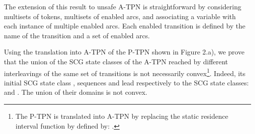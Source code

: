 \documentclass[submission,copyright,creativecommons]{eptcs}
\numberwithin{equation}{section}
\begin{document}
\par The extension of this result to unsafe A-TPN is straightforward by considering multisets of tokens, multisets of enabled arcs, and associating a variable with each instance of multiple enabled arcs. Each enabled transition is defined by the name of the transition and a set of enabled arcs.

\par Using the translation into A-TPN of the P-TPN shown in Figure 2.a), we prove that the union of the SCG state classes of the A-TPN reached by different interleavings of the same set of transitions is not necessarily convex\footnote{The P-TPN is translated into A-TPN by replacing the static residence interval function  by  defined by: .}. Indeed, its initial SCG state class , sequences  and  lead
respectively to the SCG state classes:  and . The union of their domains is not convex.
\end{document}
